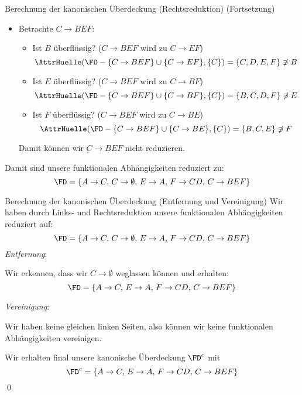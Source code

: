 \begin{example}{Berechnung der kanonischen Überdeckung (Rechtsreduktion) (Fortsetzung)}
\begin{itemize}
        \item Betrachte $C \to BEF$:
              \begin{itemize}
                  \item Ist $B$ überflüssig? ($C \to BEF$ wird zu $C \to EF$)
                        \[
                            \AttrHuelle(\FD - \{ C \to BEF \} \cup \{ C \to EF \}, \{C\}) = \{ C, D, E, F \} \not\ni B
                        \]
                  \item Ist $E$ überflüssig? ($C \to BEF$ wird zu $C \to BF$)
                        \[
                            \AttrHuelle(\FD - \{ C \to BEF \} \cup \{ C \to BF \}, \{C\}) = \{ B, C, D, F \} \not\ni E
                        \]
                  \item Ist $F$ überflüssig? ($C \to BEF$ wird zu $C \to BE$)
                        \[
                            \AttrHuelle(\FD - \{ C \to BEF \} \cup \{ C \to BE \}, \{C\}) = \{ B, C, E \} \not\ni F
                        \]
              \end{itemize}
              Damit können wir $C \to BEF$ nicht reduzieren.
    \end{itemize}

    Damit sind unsere funktionalen Abhängigkeiten reduziert zu:
    \[
        \FD = \{
        A \to C, \,
        C \to \emptyset, \,
        E \to A, \,
        F \to CD, \,
        C \to BEF
        \}
    \]
\end{example}

\begin{example}{Berechnung der kanonischen Überdeckung (Entfernung und Vereinigung)}
    Wir haben durch Links- und Rechtsreduktion unsere funktionalen Abhängigkeiten reduziert auf:
    \[
        \FD = \{
        A \to C, \,
        C \to \emptyset, \,
        E \to A, \,
        F \to CD, \,
        C \to BEF
        \}
    \]
    \emph{Entfernung}:

    Wir erkennen, dass wir $C \to \emptyset$ weglassen können und erhalten:
    \[
        \FD = \{
        A \to C, \,
        E \to A, \,
        F \to CD, \,
        C \to BEF
        \}
    \]

    \emph{Vereinigung}:

    Wir haben keine gleichen linken Seiten, also können wir keine funktionalen Abhängigkeiten vereinigen.

    Wir erhalten final unsere kanonische Überdeckung $\FD^c$ mit
    \[
        \FD^c = \{
        A \to C, \,
        E \to A, \,
        F \to CD, \,
        C \to BEF
        \}
    \]
    \qed
\end{example}

